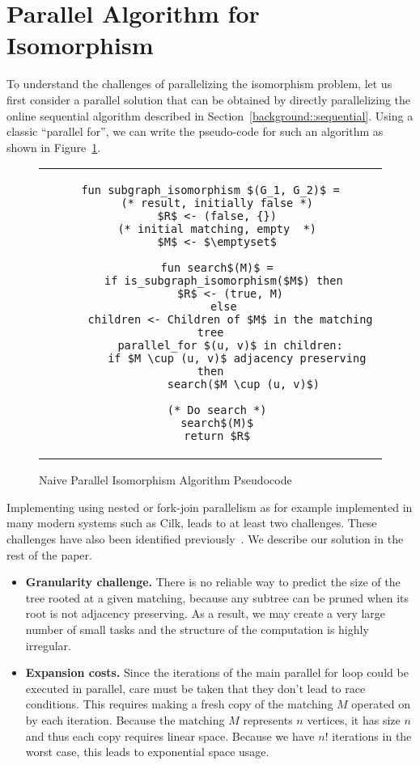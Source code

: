 
%
\section{Parallel Algorithm for Isomorphism}\label{sec:par-alg}

To understand the challenges of parallelizing the isomorphism problem,
let us first consider a parallel solution that can be obtained by
directly parallelizing the online sequential algorithm described in
Section~\ref{background::sequential}.
%
Using a classic ``parallel for'', we can write the pseudo-code for
such an algorithm as shown in  Figure~\ref{par-alg}.
%


%
\begin{figure}
  \centering

  \hspace*{3mm}
 \begin{tabular}{c}
\begin{lstlisting}
fun subgraph_isomorphism $(G_1, G_2)$ =
  (* result, initially false *)
  $R$ <- (false, {})
  (* initial matching, empty  *)
  $M$ <- $\emptyset$

  fun search$(M)$ =
    if is_subgraph_isomorphism($M$) then
      $R$ <- (true, M)
    else
      children <- Children of $M$ in the matching tree
      parallel_for $(u, v)$ in children:
        if $M \cup (u, v)$ adjacency preserving then
          search($M \cup (u, v)$)

  (* Do search *)
  search$(M)$
  return $R$
\end{lstlisting}
\end{tabular}
\caption{Naive Parallel Isomorphism Algorithm Pseudocode}
\label{par-alg}
\end{figure}

Implementing  using nested or fork-join parallelism
as for example implemented in many modern systems such as Cilk, leads
to at least two challenges.
%
These challenges have also been identified
previously~\cite{blankstein}.  We describe  our solution in the rest
of the paper.
%
\begin{itemize}
  \item \textbf{Granularity challenge.} There is no reliable way to
  predict the size of the tree rooted at a given matching, because
  any subtree can be pruned when its root is not adjacency preserving.
  As a result, we may create a very large number of small tasks and the
  structure of the computation is highly irregular.

\item \textbf{Expansion costs.} Since the iterations of the main
  parallel for loop could be executed in parallel, care must be taken
  that they don't lead to race conditions.  This requires making a
  fresh copy of the matching $M$ operated on by each
  iteration. Because the matching $M$ represents $n$ vertices, it has
  size $n$ and thus each copy requires linear space.
  Because we have $n!$ iterations in the worst case, this leads to
  exponential space usage.
\end{itemize}

